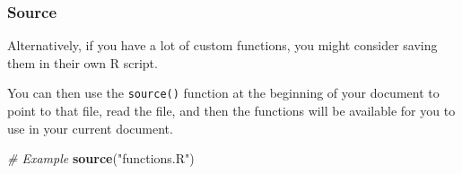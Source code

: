 \documentclass[
]{article}
\newenvironment{Shaded}{\begin{snugshade}}{\end{snugshade}}
\newcommand{\CommentTok}[1]{\textcolor[rgb]{0.56,0.35,0.01}{\textit{#1}}}
\newcommand{\FunctionTok}[1]{\textcolor[rgb]{0.13,0.29,0.53}{\textbf{#1}}}
\newcommand{\NormalTok}[1]{#1}
\newcommand{\StringTok}[1]{\textcolor[rgb]{0.31,0.60,0.02}{#1}}
\begin{document}
\subsubsection{Source}\label{source}

Alternatively, if you have a lot of custom functions, you might consider
saving them in their own R script.

You can then use the \texttt{source()} function at the beginning of your
document to point to that file, read the file, and then the functions
will be available for you to use in your current document.

\begin{Shaded}
\begin{Highlighting}[]
\CommentTok{\# Example}
\FunctionTok{source}\NormalTok{(}\StringTok{"functions.R"}\NormalTok{)}
\end{Highlighting}
\end{Shaded}
\end{document}
